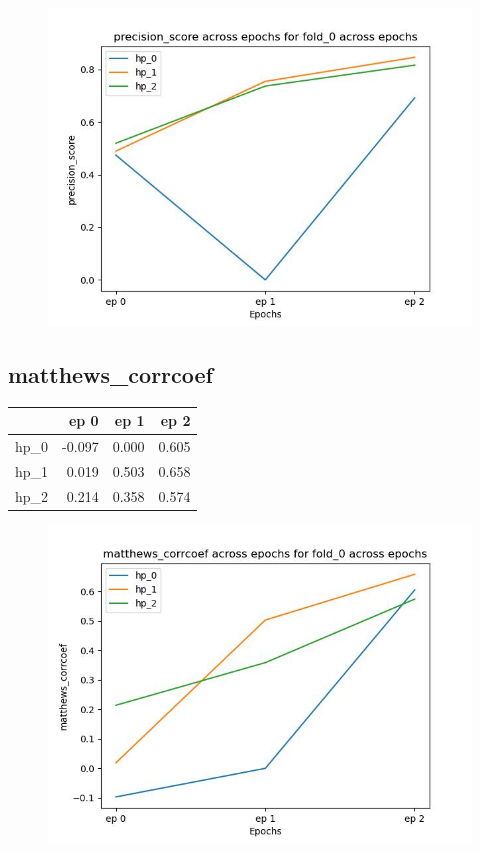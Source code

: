 \documentclass{article}
\begin{document}
\begin{figure}[H]
\includegraphics[scale = 0.75]{fold_0/precision_score}
\end{figure}
\subsection{matthews\_corrcoef}
\begin{tabular}{lrrr}
\toprule
{} &   ep 0 &   ep 1 &   ep 2 \\
\midrule
hp\_0 & -0.097 &  0.000 &  0.605 \\
hp\_1 &  0.019 &  0.503 &  0.658 \\
hp\_2 &  0.214 &  0.358 &  0.574 \\
\bottomrule
\end{tabular}

\begin{figure}[H]
\includegraphics[scale = 0.75]{fold_0/matthews_corrcoef}
\end{figure}
\end{document}
